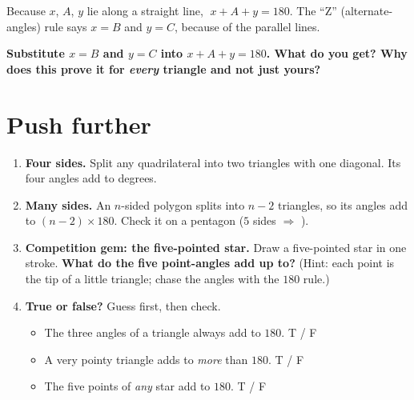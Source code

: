 \documentclass[11pt]{article}
\newcommand{\drawbox}[1]{%
  \par\vspace{4pt}\noindent
  \fbox{\rule{0pt}{#1}\rule{\dimexpr\linewidth-2\fboxsep-2\fboxrule}{0pt}}%
  \par\vspace{6pt}}
\newcommand{\task}[1]{\par\medskip\noindent\textbf{\color{benblue}#1}\par\nopagebreak}
\begin{document}
Because $x$, $A$, $y$ lie along a straight line, $\;x + A + y = 180.$ The ``Z''
(alternate-angles) rule says $x = B$ and $y = C$, because of the parallel lines.

\task{Substitute $x=B$ and $y=C$ into $x + A + y = 180$. What do you get? Why does
this prove it for \emph{every} triangle and not just yours?}
\drawbox{2.6cm}

\section*{Push further}
\begin{enumerate}[leftmargin=*]
  \item \textbf{Four sides.} Split any quadrilateral into two triangles with one
        diagonal. Its four angles add to \underline{\hspace{2cm}} degrees.
  \item \textbf{Many sides.} An $n$-sided polygon splits into $n-2$ triangles, so
        its angles add to $(n-2)\times 180$. Check it on a pentagon
        ($5$ sides $\Rightarrow$ \underline{\hspace{2cm}}).
  \item \textbf{Competition gem: the five-pointed star.} Draw a five-pointed star
        in one stroke. \textbf{What do the five point-angles add up to?} (Hint:
        each point is the tip of a little triangle; chase the angles with the
        $180$ rule.)
        \drawbox{3.5cm}
  \item \textbf{True or false?} Guess first, then check.
        \begin{itemize}
          \item The three angles of a triangle always add to $180$. \hfill T \quad / \quad F
          \item A very pointy triangle adds to \emph{more} than $180$. \hfill T \quad / \quad F
          \item The five points of \emph{any} star add to $180$. \hfill T \quad / \quad F
        \end{itemize}
\end{enumerate}
\end{document}
